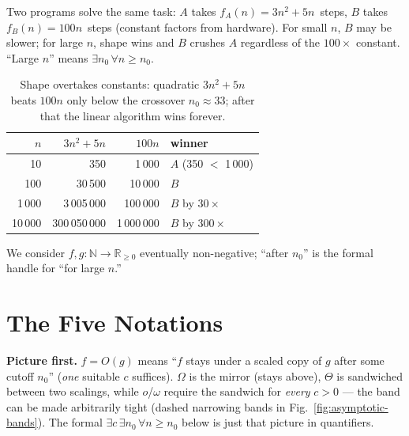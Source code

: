 Two programs solve the same task: $A$ takes $f_{A}(n)=3n^{2}+5n$~steps, $B$ takes $f_{B}(n)=100n$~steps (constant factors from hardware). For small $n$, $B$ may be slower; for large $n$, shape wins and $B$ crushes $A$ regardless of the $100\times$ constant. ``Large $n$'' means $\exists n_{0}\,\forall n\ge n_{0}$.

\begin{table}[h]\centering\small
\begin{tabular}{r r r l}
\toprule $n$ & $3n^{2}+5n$ & $100n$ & winner \\\midrule
10 & 350 & 1\,000 & $A$ (350 $<$ 1\,000) \\
100 & 30\,500 & 10\,000 & $B$ \\
1\,000 & 3\,005\,000 & 100\,000 & $B$ by $30\times$ \\
10\,000 & 300\,050\,000 & 1\,000\,000 & $B$ by $300\times$ \\\bottomrule
\end{tabular}
\caption{Shape overtakes constants: quadratic $3n^{2}+5n$ beats $100n$ only below the crossover $n_{0}\approx33$; after that the linear algorithm wins forever.}
\label{tab:shape-wins}
\end{table}

We consider $f,g:\mathbb{N}\to\mathbb{R}_{\ge0}$ eventually non-negative; ``after $n_{0}$'' is the formal handle for ``for large $n$.''

\section{The Five Notations}
\label{sec:five-notations}
\textbf{Picture first.} $f=O(g)$ means ``$f$ stays under a scaled copy of $g$ after some cutoff $n_{0}$'' (\emph{one} suitable $c$ suffices). $\Omega$ is the mirror (stays above), $\Theta$ is sandwiched between two scalings, while $o$/$\omega$ require the sandwich for \emph{every} $c>0$ --- the band can be made arbitrarily tight (dashed narrowing bands in Fig.~\ref{fig:asymptotic-bands}). The formal $\exists c\,\exists n_{0}\,\forall n\ge n_{0}$ below is just that picture in quantifiers.

